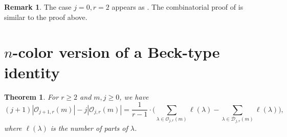 \documentclass[reqno,12pt]{amsart}
\newtheorem{theorem}{Theorem}[section]
\theoremstyle{definition}
\newtheorem{remark}{Remark}
\begin{document}
    \begin{remark}
         The case $j=0, r=2$ appears as \cite[Corollary 4]{NR26}. The combinatorial proof of \cite[Theorem 5]{NR26} is similar to the proof above. 
    \end{remark}

\section{$n$-color version of a Beck-type identity}

\begin{theorem} \label{B1}
For $r\geq2$ and $m,j\geq0$, we have
\begin{equation}\label{eqnBG}
(j+1)\left|\mathcal{O}_{j+1,r}(m)\right|-j\left|\mathcal{O}_{j,r}(m)\right|=\frac{1}{r-1}\cdot\Big(\sum_{\lambda\in\mathcal{O}_{j,r}(m)}\ell(\lambda)-\sum_{\lambda\in\mathcal{D}_{j,r}(m)}\ell(\lambda)\Big),
\end{equation}
 where $\ell(\lambda)$ is the number of parts of $\lambda$.
\end{theorem}
\end{document}
